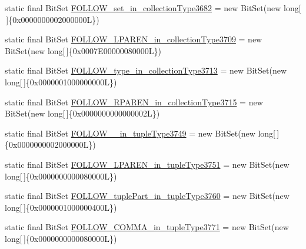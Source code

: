 \begin{DoxyCompactItemize}
\item 
static final Bit\-Set \hyperlink{classorg_1_1tzi_1_1use_1_1parser_1_1testsuite_1_1_test_suite_parser_a41b1dfc9a00ffa268c43a2fcb5a89b77}{F\-O\-L\-L\-O\-W\-\_\-set\-\_\-in\-\_\-collection\-Type3682} = new Bit\-Set(new long\mbox{[}$\,$\mbox{]}\{0x0000000002000000\-L\})
\item 
static final Bit\-Set \hyperlink{classorg_1_1tzi_1_1use_1_1parser_1_1testsuite_1_1_test_suite_parser_a3657975421af8127937c076e0dca019e}{F\-O\-L\-L\-O\-W\-\_\-\-L\-P\-A\-R\-E\-N\-\_\-in\-\_\-collection\-Type3709} = new Bit\-Set(new long\mbox{[}$\,$\mbox{]}\{0x0007\-E00000080000\-L\})
\item 
static final Bit\-Set \hyperlink{classorg_1_1tzi_1_1use_1_1parser_1_1testsuite_1_1_test_suite_parser_a95f3d353c25c6acda1eef7a933c4d91a}{F\-O\-L\-L\-O\-W\-\_\-type\-\_\-in\-\_\-collection\-Type3713} = new Bit\-Set(new long\mbox{[}$\,$\mbox{]}\{0x0000001000000000\-L\})
\item 
static final Bit\-Set \hyperlink{classorg_1_1tzi_1_1use_1_1parser_1_1testsuite_1_1_test_suite_parser_a94b3c34e29d9a8e1eefe437a4a4c655b}{F\-O\-L\-L\-O\-W\-\_\-\-R\-P\-A\-R\-E\-N\-\_\-in\-\_\-collection\-Type3715} = new Bit\-Set(new long\mbox{[}$\,$\mbox{]}\{0x0000000000000002\-L\})
\item 
static final Bit\-Set \hyperlink{classorg_1_1tzi_1_1use_1_1parser_1_1testsuite_1_1_test_suite_parser_a1c0f0c89956b4d7718beb305dea4b0e0}{F\-O\-L\-L\-O\-W\-\_\-\_\-in\-\_\-tuple\-Type3749} = new Bit\-Set(new long\mbox{[}$\,$\mbox{]}\{0x0000000002000000\-L\})
\item 
static final Bit\-Set \hyperlink{classorg_1_1tzi_1_1use_1_1parser_1_1testsuite_1_1_test_suite_parser_a0f65671d0bac49f3ec6641f8f9d65957}{F\-O\-L\-L\-O\-W\-\_\-\-L\-P\-A\-R\-E\-N\-\_\-in\-\_\-tuple\-Type3751} = new Bit\-Set(new long\mbox{[}$\,$\mbox{]}\{0x0000000000080000\-L\})
\item 
static final Bit\-Set \hyperlink{classorg_1_1tzi_1_1use_1_1parser_1_1testsuite_1_1_test_suite_parser_a50bd6234547c277bb12a552688a7252c}{F\-O\-L\-L\-O\-W\-\_\-tuple\-Part\-\_\-in\-\_\-tuple\-Type3760} = new Bit\-Set(new long\mbox{[}$\,$\mbox{]}\{0x0000001000000400\-L\})
\item 
static final Bit\-Set \hyperlink{classorg_1_1tzi_1_1use_1_1parser_1_1testsuite_1_1_test_suite_parser_a39937c7c3135fd794b335fccd5b7d3ec}{F\-O\-L\-L\-O\-W\-\_\-\-C\-O\-M\-M\-A\-\_\-in\-\_\-tuple\-Type3771} = new Bit\-Set(new long\mbox{[}$\,$\mbox{]}\{0x0000000000080000\-L\})
\item 

\end{DoxyCompactItemize}
